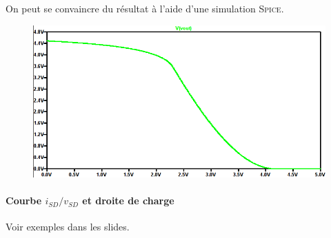 On peut se convaincre du résultat à l'aide d'une simulation \textsc{Spice}.

\begin{figure}[ht]
	\centering
	\includegraphics[scale=0.45]{exo1.png}
\end{figure}

\paragraph{Courbe $i_{SD}/v_{SD}$ et droite de charge}
Voir exemples dans les slides.

